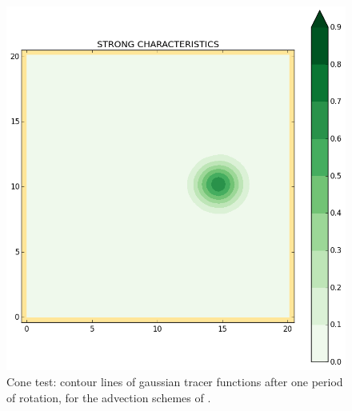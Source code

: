 \begin{figure}[h!]
\begin{minipage}[t]{0.50\textwidth}
\end{minipage}%
\begin{minipage}[t]{0.50\textwidth}
 \centering
 \includegraphics[trim=19mm 19mm 35mm 21mm,clip,scale=0.28]{../img/figure_SC.png}
\end{minipage}
 \caption{Cone test: contour lines of gaussian tracer functions after one period of rotation, for the advection schemes of .}
 \label{t2d:cone:profiles1}
\end{figure}
